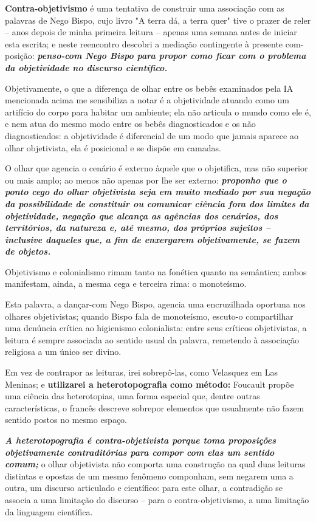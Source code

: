 \textbf{Contra-objetivismo} é uma tentativa de construir uma associação com as palavras de Nego Bispo, cujo livro "A terra dá, a terra quer" tive o prazer de reler -- anos depois de minha primeira leitura -- apenas uma semana antes de iniciar esta escrita;
    e neste reencontro descobri a mediação contingente à presente com-posição:
        \textbf{\textit{penso-com Nego Bispo para propor como ficar com o problema da objetividade no discurso científico.}}

Objetivamente, o que a diferença de olhar entre os bebês examinados pela IA mencionada acima me sensibiliza a notar é a objetividade atuando como um artifício do corpo para habitar um ambiente;
    ela não articula o mundo como ele é, e nem atua do mesmo modo entre os bebês diagnosticados e os não diagnosticados:
        a objetividade é diferencial de um modo que jamais aparece ao olhar objetivista, ela é posicional e se dispõe em camadas.

O olhar que agencia o cenário é externo àquele que o objetifica, mas não superior ou mais amplo;
    ao menos não apenas por lhe ser externo:
        \textbf{\textit{proponho que o ponto cego do olhar objetivista seja em muito mediado por sua negação da possibilidade de constituir ou comunicar ciência fora dos limites da objetividade, negação que alcança as agências dos cenários, dos territórios, da natureza e, até mesmo, dos próprios sujeitos -- inclusive daqueles que, a fim de enxergarem objetivamente, se fazem de objetos.}}
        
Objetivismo e colonialismo rimam tanto na fonética quanto na semântica; 
    ambos manifestam, ainda, a mesma cega e terceira rima:
        o monoteísmo.

Esta palavra, a dançar-com Nego Bispo, agencia uma encruzilhada oportuna nos olhares objetivistas;
    quando Bispo fala de monoteísmo, escuto-o compartilhar uma denúncia crítica ao higienismo colonialista:
        entre seus críticos objetivistas, a leitura é sempre associada ao sentido usual da palavra, remetendo à associação religiosa a um único ser divino.

Em vez de contrapor as leituras, irei sobrepô-las, como Velasquez em Las Meninas;
    e \textbf{utilizarei a heterotopografia como método:}
        Foucault propõe uma ciência das heterotopias, uma forma especial que, dentre outras características, o francês descreve sobrepor elementos que usualmente não fazem sentido postos no mesmo espaço.

\textbf{\textit{A heterotopografia é contra-objetivista porque toma proposições objetivamente contraditórias para compor com elas um sentido comum;}}
    o olhar objetivista não comporta uma construção na qual duas leituras distintas e opostas de um mesmo fenômeno componham, sem negarem uma a outra, um discurso articulado e científico:
        para este olhar, a contradição se associa a uma limitação do discurso -- para o contra-objetivismo, a uma limitação da linguagem científica.
        
